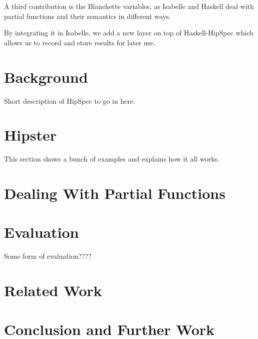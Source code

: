 \documentclass{llncs}
\begin{document}
A third contribution is the Blanchette variables, as Isabelle and Haskell deal with partial functions and their semantics in different ways.  

By integrating it in Isabelle, we add a new layer on top of Haskell-HipSpec which allows us to record and store results for later use.

\section{Background}
Short description of HipSpec to go in here.

\section{Hipster}
This section shows a bunch of examples and explains how it all works.

\section{Dealing With Partial Functions}


\section{Evaluation}
Some form of evaluation????

\section{Related Work}
%

\section{Conclusion and Further Work}
%



\end{document}
